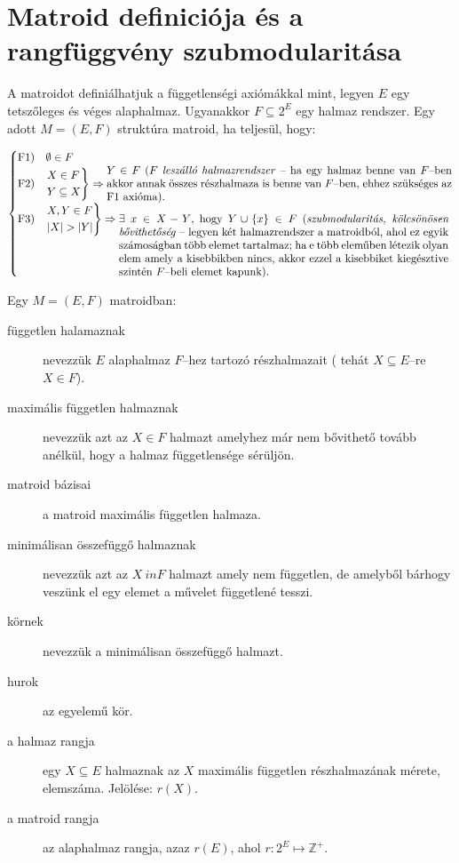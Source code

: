 \section{Matroid definiciója és a rangfüggvény szubmodularitása}

A matroidot definiálhatjuk a függetlenségi axiómákkal mint, legyen $E$ egy
tetszőleges és véges alaphalmaz. Ugyanakkor $F \subseteq  2^E$ egy halmaz
rendszer. Egy adott $M=(E,F)$ struktúra matroid, ha teljesül, hogy:

\[
\begin{cases}
\mbox{F1}) &\emptyset \in F \\
\mbox{F2}) &\begin{rcases}
X \in F \\ 
Y \subseteq X 
\end{rcases} \Rightarrow \parbox[L]{11cm}{$Y \in F$
($F$ \emph{leszálló halmazrendszer} -- ha egy halmaz benne van $F$--ben akkor annak összes
részhalmaza is benne van $F$--ben, ehhez szükséges az F$1$ axióma).
} \\
\mbox{F3}) &\begin{rcases}
X,Y \in F\\
|X| > |Y| \\
\end{rcases} \Rightarrow\parbox[t]{10.5cm}{ $\exists~x \in X-Y$,~hogy $Y \cup \{x\}
\in F~($\emph{szubmodularitás, kölcsönösen bővithetőség} -- legyen két halmazrendszer
a matroidból, ahol ez egyik számoságban több elemet tartalmaz; ha e több
eleműben létezik olyan elem amely a kisebbikben nincs, akkor ezzel a kisebbiket
kiegésztive szintén $F$--beli elemet kapunk).}
\end{cases}
\]

Egy $M=(E,F)$ matroidban: 

\begin{description}
  \item[független halamaznak] nevezzük $E$ alaphalmaz $F$--hez tartozó
  részhalmazait ( tehát $X\subseteq E$--re $X \in F$).
  \item[maximális független halmaznak] nevezzük azt az $X \in F$ halmazt
  amelyhez már nem bővithető tovább anélkül, hogy a halmaz függetlensége
  sérüljön.
  \item[matroid bázisai] a matroid maximális független halmaza.
  \item[minimálisan összefüggő halmaznak] nevezzük azt az $X \ in F$ halmazt
  amely nem független, de amelyből bárhogy veszünk el egy elemet a művelet
  függetlené tesszi.
  \item[körnek] nevezzük a minimálisan összefüggő halmazt.
  \item[hurok] az egyelemű kör. 
  \item[a halmaz rangja] egy $X\subseteq E$ halmaznak az $X$ maximális
  független részhalmazának mérete, elemszáma. Jelölése: $r(X)$.
  \item[a matroid rangja] az alaphalmaz rangja, azaz $r(E)$, ahol $r:2^E \mapsto \mathbb{Z}^+$.
\end{description}

